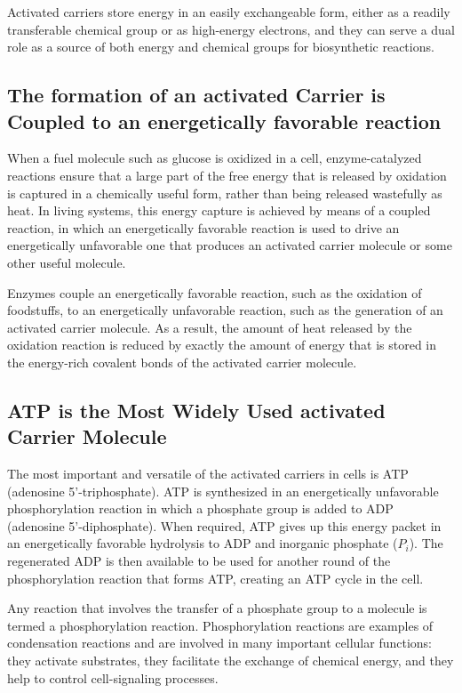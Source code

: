 Activated carriers store energy in an easily exchangeable form, either
as a readily transferable chemical group or as high-energy electrons,
and they can serve a dual role as a source of both energy and chemical
groups for biosynthetic reactions.

\subsection{The formation of an activated Carrier is Coupled to an energetically favorable reaction}

When a fuel molecule such as glucose is oxidized in a cell, enzyme-catalyzed
reactions ensure that a large part of the free energy that is released
by oxidation is captured in a chemically useful form, rather than being
released wastefully as heat. In living systems, this energy capture is achieved by means of a
coupled reaction, in which an energetically favorable reaction is used to
drive an energetically unfavorable one that produces an activated carrier
molecule or some other useful molecule.

Enzymes couple an energetically favorable reaction, such
as the oxidation of foodstuffs, to an energetically unfavorable reaction,
such as the generation of an activated carrier molecule. As a result, the
amount of heat released by the oxidation reaction is reduced
by exactly the amount of energy that is stored in the energy-rich covalent bonds
of the activated carrier molecule.

\subsection{ATP is the Most Widely Used activated Carrier Molecule}

The most important and versatile of the activated carriers in cells is
ATP (adenosine 5'-triphosphate). ATP is synthesized in an energetically unfavorable
phosphorylation reaction in which a phosphate group is added to ADP
(adenosine 5'-diphosphate).
When required, ATP gives up this energy
packet in an energetically favorable hydrolysis to ADP and inorganic
phosphate ($P_{i}$). The regenerated ADP is then available to be used for
another round of the phosphorylation reaction that forms ATP, creating
an ATP cycle in the cell.

Any reaction that involves the transfer of a phosphate group to a molecule is termed a
phosphorylation reaction. Phosphorylation reactions are examples of condensation reactions
and are involved in many important cellular functions: they
activate substrates, they facilitate the exchange of chemical energy, and
they help to control cell-signaling processes.

